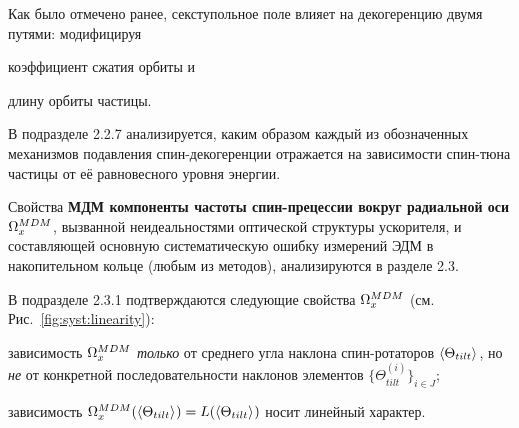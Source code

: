 Как было отмечено ранее, секступольное поле влияет на декогеренцию двумя путями: 
модифицируя 
\begin{enumerate*}[(1)] 
	\item коэффициент сжатия орбиты и 
	\item длину орбиты частицы.
\end{enumerate*}
В подразделе 2.2.7 анализируется, каким образом каждый из обозначенных механизмов 
подавления спин-декогеренции отражается на зависимости спин-тюна частицы
от её равновесного уровня энергии.

Свойства \textbf{МДМ компоненты частоты спин-прецессии вокруг радиальной оси} $\Omega_x^{MDM}$, вызванной 
неидеальностями оптической структуры ускорителя, и составляющей основную 
систематическую ошибку измерений ЭДМ в накопительном кольце (любым из методов), анализируются в разделе 2.3.

В подразделе 2.3.1 подтверждаются следующие свойства $\Omega_x^{MDM}$ (см. Рис.~\ref{fig:syst:linearity}):
\begin{enumerate*}[(1)]
	\item зависимость $\Omega_x^{MDM}$ \emph{только} от среднего угла наклона спин-ротаторов $\avg{\Theta_{tilt}}$, 
	но \emph{не} от конкретной последовательности наклонов элементов $\{\Theta_{tilt}^{(i)}\}_{i\in J}$;
	\item зависимость $\W_x^{MDM}(\avg{\Theta_{tilt}}) = L(\avg{\Theta_{tilt}})$ носит линейный характер.
\end{enumerate*}

